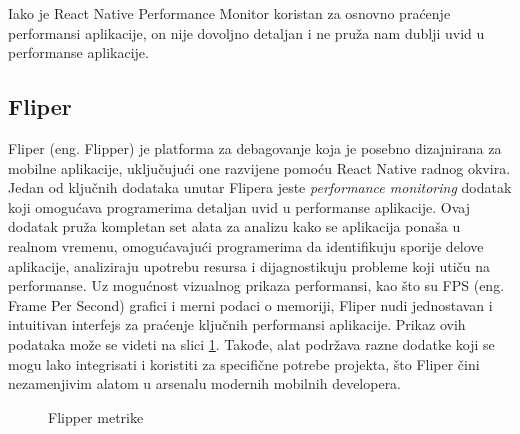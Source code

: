 \documentclass[12pt,oneside]{memoir}
\begin{document}
Iako je React Native Performance Monitor koristan za osnovno praćenje performansi aplikacije, on nije dovoljno detaljan i ne pruža nam dublji uvid u performanse aplikacije.

\subsection{Fliper}

Fliper\cite{Flipper} (eng. Flipper) je platforma za debagovanje koja je posebno dizajnirana za mobilne aplikacije, uključujući one razvijene pomoću React Native radnog okvira. Jedan od ključnih dodataka unutar Flipera jeste \textit{performance monitoring} dodatak koji omogućava programerima detaljan uvid u performanse aplikacije. Ovaj dodatak pruža kompletan set alata za analizu kako se aplikacija ponaša u realnom vremenu, omogućavajući programerima da identifikuju sporije delove aplikacije, analiziraju upotrebu resursa i dijagnostikuju probleme koji utiču na performanse. Uz mogućnost vizualnog prikaza performansi, kao što su FPS (eng. Frame Per Second) grafici i merni podaci o memoriji, Fliper nudi jednostavan i intuitivan interfejs za praćenje ključnih performansi aplikacije. Prikaz ovih podataka može se videti na slici \ref{fig:flipperMetrics}. Takođe, alat podržava razne dodatke koji se mogu lako integrisati i koristiti za specifične potrebe projekta, što Fliper čini nezamenjivim alatom u arsenalu modernih mobilnih developera.

\begin{figure}[!h]
    \centering
    \qquad
    \caption{Flipper metrike}
    \label{fig:flipperMetrics}
\end{figure}
\end{document}
